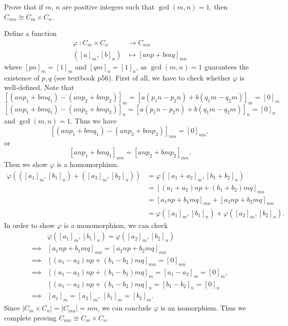 \documentclass[12pt,letterpaper,boxed]{hmcpset}
\begin{document}
\begin{problem}[4.9]
Prove that if $m$, $n$ are positive integers such that $\gcd(m, n) = 1$, then $C_{mn}\cong C_{m}\times C_n$.
\end{problem}
\begin{solution}
Define a function
\[
\begin{aligned}
\varphi\;: C_{m}\times C_n&\longrightarrow C_{mn}\\  
([a]_m,[b]_n)&\longmapsto [anp+bmq]_{mn}
\end{aligned}
\]	
where $[pn]_m=[1]_m$ and $[qm]_n=[1]_n$, as $\gcd(m, n) = 1$ guarantees the existence of $p,q$ (see textbook p56). First of all, we have to check whether $\varphi$ is well-defined. Note that 		
\[
[(anp_1+bmq_1)-(anp_2+bmp_2)]_{m}=[a(p_1n-p_2n)+b(q_1m-q_2m)]_{m}=[0]_m
\]	
\[
[(anp_1+bmq_1)-(anp_2+bmp_2)]_{n}=[a(p_1n-p_2n)+b(q_1m-q_2m)]_{n}=[0]_n
\]
and $\gcd(m, n) = 1$. Thus we have
\[
[(anp_1+bmq_1)-(anp_2+bmp_2)]_{mn}=[0]_{mn},
\]
or
\[
[anp_1+bmq_1]_{mn}=[anp_2+bmp_2]_{mn}.
\]
Then we show $\varphi$ is a homomorphism.
\begin{align*}
\varphi(([a_1]_m,[b_1]_n)+([a_2]_m,[b_2]_n))&=\varphi([a_1+a_2]_m,[b_1+b_2]_n)\\
&=[(a_1+a_2)np+(b_1+b_2)mq]_{mn}\\
&=[a_1np+b_1mq]_{mn}+[a_2np+b_2mq]_{mn}\\
&=\varphi([a_1]_m,[b_1]_n)+\varphi([a_2]_m,[b_2]_n).
\end{align*}
In order to show $\varphi$ is a monomorphism, we can check 
\begin{align*}
&\varphi([a_1]_m,[b_1]_n)=\varphi([a_2]_m,[b_2]_n)\\
\implies&[a_1np+b_1mq]_{mn}=[a_2np+b_2mq]_{mn}\\
\implies&[(a_1-a_2)np+(b_1-b_2)mq]_{mn}=[0]_{mn}\\
\implies&[(a_1-a_2)np+(b_1-b_2)mq]_{m}=[a_1-a_2]_{m}=[0]_m,\\
&[(a_1-a_2)np+(b_1-b_2)mq]_{n}=[b_1-b_2]_{n}=[0]_n\\
\implies&[a_1]_m=[a_2]_m,\ [b_1]_m=[b_2]_m.
\end{align*}
Since  $|C_{m}\times C_n|= |C_{mn}|=mn$, we can conclude $\varphi$ is an isomorphism. Thus we complete proving $C_{mn}\cong C_{m}\times C_n$.
	
\end{solution}
\end{document}
